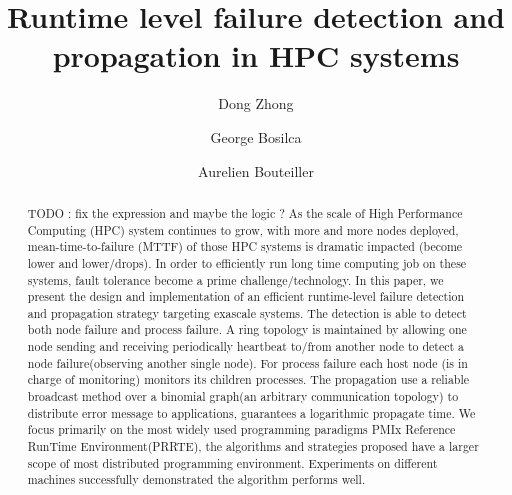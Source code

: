 \documentclass[sigconf]{acmart}
\begin{document}
%
\title{Runtime level failure detection and propagation in HPC systems}

%
\author{Dong Zhong}
\authornotemark[1]

\author{George Bosilca}

\author{Aurelien Bouteiller}

%
\renewcommand{\shortauthors}{Dong and Aurelien, et al.}

%
\begin{abstract}
TODO : fix the expression and maybe the logic ?
As the scale of High Performance Computing (HPC) system continues to grow, with more and more nodes deployed, mean-time-to-failure (MTTF) of those HPC systems is dramatic impacted (become lower and lower/drops). In order to efficiently run long time computing job on these systems, fault tolerance become a prime challenge/technology. In this paper, we present the design and implementation of an efficient runtime-level failure detection and propagation strategy targeting exascale systems. The detection is able to detect both node failure and process failure. A ring topology is maintained by allowing one node sending and receiving periodically heartbeat to/from another node to detect a node failure(observing another single node). For process failure each host node (is in charge of monitoring) monitors its children processes. The propagation use a reliable broadcast method over a binomial graph(an arbitrary communication topology) to distribute error message to applications, guarantees a logarithmic propagate time. We focus primarily on the most widely used programming paradigms PMIx Reference RunTime Environment(PRRTE), the algorithms and strategies proposed have a larger scope of most distributed programming environment. Experiments on different machines successfully demonstrated the algorithm performs well.
\end{abstract}
\end{document}
